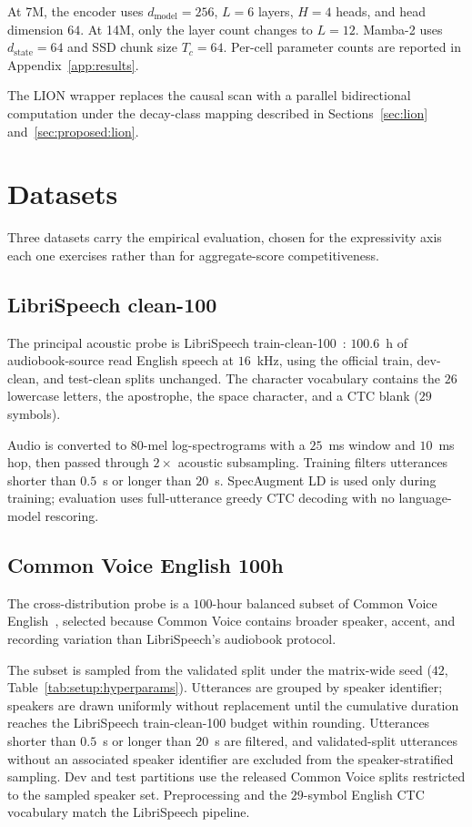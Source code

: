 At 7M, the encoder uses $d_{\text{model}} = 256$, $L = 6$ layers,
$H = 4$ heads, and head dimension $64$. At 14M, only the layer
count changes to $L = 12$. Mamba-2 uses $d_{\text{state}} = 64$
and SSD chunk size $T_{c} = 64$. Per-cell parameter counts are
reported in Appendix~\ref{app:results}.

The LION wrapper replaces the causal scan with a parallel
bidirectional computation under the decay-class mapping described
in Sections~\ref{sec:lion} and~\ref{sec:proposed:lion}.

\section{Datasets}\label{app:setup:datasets}

Three datasets carry the empirical evaluation, chosen for the
expressivity axis each one exercises rather than for aggregate-score
competitiveness.

\subsection{LibriSpeech clean-100}\label{app:setup:librispeech}

The principal acoustic probe is LibriSpeech
train-clean-100~\cite{panayotov2015librispeech}: $100.6$~h of
audiobook-source read English speech at $16$~kHz, using the
official train, dev-clean, and test-clean splits unchanged. The
character vocabulary contains the $26$ lowercase letters, the
apostrophe, the space character, and a CTC blank ($29$ symbols).

Audio is converted to $80$-mel log-spectrograms with a $25$~ms
window and $10$~ms hop, then passed through $2\times$ acoustic
subsampling. Training filters utterances shorter than $0.5$~s or
longer than $20$~s. SpecAugment LD is used only during training;
evaluation uses full-utterance greedy CTC decoding with no
language-model rescoring.

\subsection{Common Voice English 100h}\label{app:setup:cv}

The cross-distribution probe is a $100$-hour balanced subset of
Common Voice English~\cite{ardila2019commonvoice}, selected
because Common Voice contains broader speaker, accent, and
recording variation than LibriSpeech's audiobook protocol.

The subset is sampled from the validated split under the
matrix-wide seed ($42$, Table~\ref{tab:setup:hyperparams}).
Utterances are grouped by speaker identifier; speakers are drawn
uniformly without replacement until the cumulative duration
reaches the LibriSpeech train-clean-100 budget within rounding.
Utterances shorter than $0.5$~s or longer than $20$~s are
filtered, and validated-split utterances without an associated
speaker identifier are excluded from the speaker-stratified
sampling. Dev and test partitions use the released Common Voice
splits restricted to the sampled speaker set. Preprocessing and
the $29$-symbol English CTC vocabulary match the LibriSpeech
pipeline.


